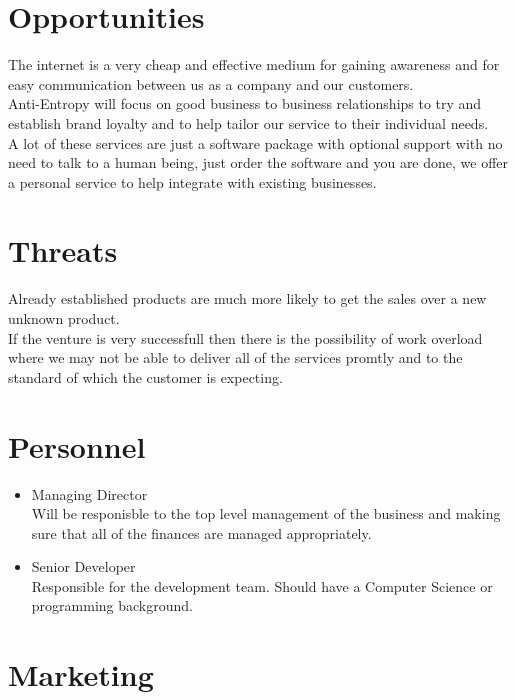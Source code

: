 \documentclass{article}
\begin{document}
\section{Opportunities}
The internet is a very cheap and effective medium for gaining awareness and for easy communication between us as a company and our customers.
\\Anti-Entropy will focus on good business to business relationships to try and establish brand loyalty and to help tailor our service to their individual needs.
\\A lot of these services are just a software package with optional support with no need to talk to a human being, just order the software and you are done, we offer a personal service to help integrate with existing businesses.

\section{Threats}
Already established products are much more likely to get the sales over a new unknown product.
\\If the venture is very successfull then there is the possibility of work overload where we may not be able to deliver all of the services promtly and to the standard of which the customer is expecting.

\section{Personnel}
\begin{itemize}
\item Managing Director
\\Will be responisble to the top level management of the business and making sure that all of the finances are managed appropriately.

\item Senior Developer
\\Responsible for the development team.  Should have a Computer Science or programming background.
\end{itemize}


\section{Marketing}
\end{document}
